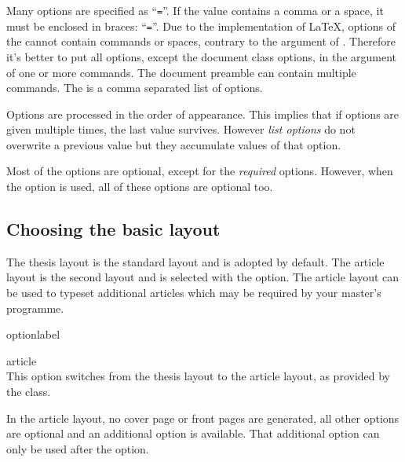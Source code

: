Many options are specified as ``\texttt{=}''. If the
value contains a comma or a space, it must be enclosed in braces:
``\texttt{=}''. Due to the implementation of LaTeX,
options of the  cannot contain commands or spaces, contrary
to the argument of \label{com:setup}. Therefore it's better to put
all options, except the document class options, in the argument of one or more
 commands. The document preamble can contain multiple
 commands. The  is a comma
separated list of options.

Options are processed in the order of appearance. This implies that if options
are given multiple times, the last value survives. However \emph{list options}
do not overwrite a previous value but they accumulate values of that option.

Most of the options are optional, except for the \emph{required} options.
However, when the option  is used, all of these options are
optional too.

\subsection{Choosing the basic layout}
The thesis layout is the standard layout and is adopted by default.
The article layout is the second layout and is selected with the 
option. The article layout can be used to typeset additional articles which may
be required by your master's programme.

\begin{labelled}{optionlabel}
\item[article]\\
  This option switches from the thesis layout to the article layout, as
  provided by the  class.

  In the article layout, no cover page or front pages are generated, all other
  options are optional and
  an additional option  is available.
  That additional option can only be used after the  option.
\end{labelled}

